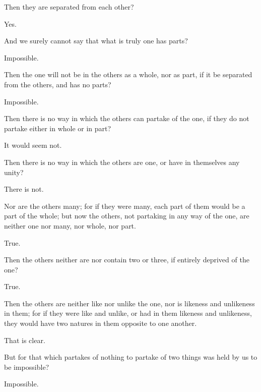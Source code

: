 \documentclass[11pt,letter]{article}
\begin{document}
\par  Then they are separated from each other?

\par  Yes.

\par  And we surely cannot say that what is truly one has parts?

\par  Impossible.

\par  Then the one will not be in the others as a whole, nor as part, if it be separated from the others, and has no parts?

\par  Impossible.

\par  Then there is no way in which the others can partake of the one, if they do not partake either in whole or in part?

\par  It would seem not.

\par  Then there is no way in which the others are one, or have in themselves any unity?

\par  There is not.

\par  Nor are the others many; for if they were many, each part of them would be a part of the whole; but now the others, not partaking in any way of the one, are neither one nor many, nor whole, nor part.

\par  True.

\par  Then the others neither are nor contain two or three, if entirely deprived of the one?

\par  True.

\par  Then the others are neither like nor unlike the one, nor is likeness and unlikeness in them; for if they were like and unlike, or had in them likeness and unlikeness, they would have two natures in them opposite to one another.

\par  That is clear.

\par  But for that which partakes of nothing to partake of two things was held by us to be impossible?

\par  Impossible.
\end{document}
